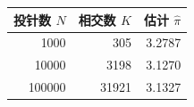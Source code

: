 \begin{tabular}{rrr}
\toprule
投针数 $N$ & 相交数 $K$ & 估计 $\widehat{\pi}$ \\
\midrule
1000 & 305 & 3.2787 \\
10000 & 3198 & 3.1270 \\
100000 & 31921 & 3.1327 \\
\bottomrule
\end{tabular}
